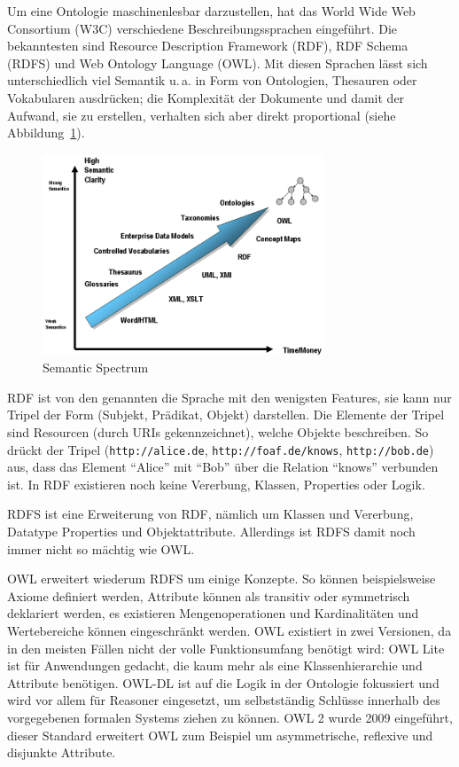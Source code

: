 \documentclass[
	headsepline,
	footsepline,
	fontsize=12pt,
	bibliography=totoc
]{scrbook}
\begin{document}
Um eine Ontologie maschinenlesbar darzustellen, hat das World Wide Web Consortium (W3C) verschiedene Beschreibungssprachen eingeführt. Die bekanntesten sind Resource Description Framework (RDF), RDF Schema (RDFS) und Web Ontology Language (OWL). Mit diesen Sprachen lässt sich unterschiedlich viel Semantik u.\,a. in Form von Ontologien, Thesauren oder Vokabularen ausdrücken; die Komplexität der Dokumente und damit der Aufwand, sie zu erstellen, verhalten sich aber direkt proportional (siehe Abbildung~\ref{figure:semantic_spectrum}).

\begin{figure}[htbp]
	\centering
	\includegraphics[width=0.75\textwidth]{images/grundlagen-semantic_spectrum.png}
	\caption{Semantic Spectrum \cite{Bergman2007}}
	\label{figure:semantic_spectrum}
\end{figure}


RDF ist von den genannten die Sprache mit den wenigsten Features, sie kann nur Tripel der Form (Subjekt, Prädikat, Objekt) darstellen. Die Elemente der Tripel sind Resourcen (durch URIs gekennzeichnet), welche Objekte beschreiben. So drückt der Tripel (\texttt{http://alice.de}, \texttt{http://foaf.de/knows}, \texttt{http://bob.de}) aus, dass das Element \enquote{Alice} mit \enquote{Bob} über die Relation \enquote{knows} verbunden ist. In RDF existieren noch keine Vererbung, Klassen, Properties oder Logik.


RDFS ist eine Erweiterung von RDF, nämlich um Klassen und Vererbung, Datatype Properties und Objektattribute. Allerdings ist RDFS damit noch immer nicht so mächtig wie OWL.


OWL erweitert wiederum RDFS um einige Konzepte. So können beispielsweise Axiome definiert werden, Attribute können als transitiv oder symmetrisch deklariert werden, es existieren Mengenoperationen und Kardinalitäten und Wertebereiche können eingeschränkt werden. OWL existiert in zwei Versionen, da in den meisten Fällen nicht der volle Funktionsumfang benötigt wird: OWL Lite ist für Anwendungen gedacht, die kaum mehr als eine Klassenhierarchie und Attribute benötigen. OWL-DL ist auf die Logik in der Ontologie fokussiert und wird vor allem für Reasoner eingesetzt, um selbstständig Schlüsse innerhalb des vorgegebenen formalen Systems ziehen zu können. OWL 2 wurde 2009 eingeführt, dieser Standard erweitert OWL zum Beispiel um asymmetrische, reflexive und disjunkte Attribute.
\end{document}
